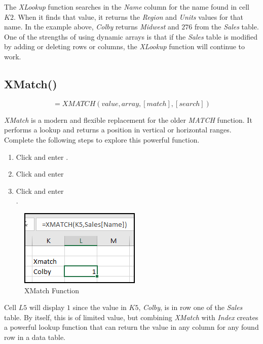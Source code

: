 The \textit{XLookup} function searches in the \textit{Name} column for the name found in cell $ K2 $. When it finds that value, it returns the \textit{Region} and \textit{Units} values for that name. In the example above, \textit{Colby} returns \textit{Midwest} and $ 276 $ from the \textit{Sales} table. One of the strengths of using dynamic arrays is that if the \textit{Sales} table is modified by adding or deleting rows or columns, the \textit{XLookup} function will continue to work.

\subsection{XMatch()}

\[ =XMATCH(value, array, [match], [search]) \]

\textit{XMatch} is a modern and flexible replacement for the older \textit{MATCH} function. It performs a lookup and returns a position in vertical or horizontal ranges. Complete the following steps to explore this powerful function.

\begin{enumbox}
	\begin{enumerate}
		\item Click  and enter .
		\item Click  and enter 
		\item Click  and enter \\ .
	\end{enumerate}
\end{enumbox}

\begin{figure}[H]
	\centering
	\includegraphics[width=\maxwidth{.50\linewidth}]{gfx/apb_fig06}
	\caption{XMatch Function}
	\label{apb:fig06}
\end{figure}

Cell $ L5 $ will display $ 1 $ since the value in $ K5 $, \textit{Colby}, is in row one of the \textit{Sales} table. By itself, this is of limited value, but combining \textit{XMatch} with \textit{Index} creates a powerful lookup function that can return the value in any column for any found row in a data table.


